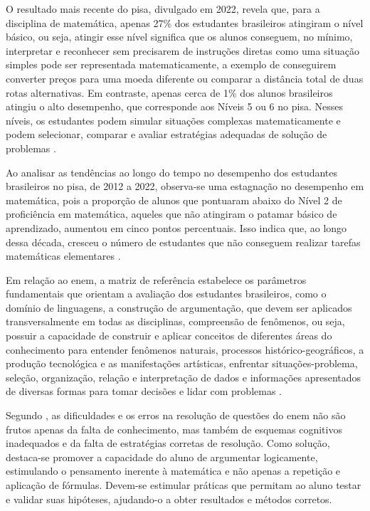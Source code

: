 O resultado mais recente do \gls{pisa}, divulgado em 2022, revela que, para a
disciplina de matemática, apenas 27\% dos estudantes brasileiros atingiram o
nível básico, ou seja, atingir esse nível significa que os alunos conseguem, no
mínimo, interpretar e reconhecer sem precisarem de instruções diretas como uma
situação simples pode ser representada matematicamente, a exemplo de conseguirem
converter preços para uma moeda diferente ou comparar a distância total de duas
rotas alternativas. Em contraste, apenas cerca de 1\% dos alunos brasileiros
atingiu o alto desempenho, que corresponde aos Níveis 5 ou 6 no \gls{pisa}. Nesses
níveis, os estudantes podem simular situações complexas matematicamente e podem
selecionar, comparar e avaliar estratégias adequadas de solução de problemas
\cite{brasil2026pisa}. 

Ao analisar as tendências ao longo do tempo no desempenho dos estudantes
brasileiros no \gls{pisa}, de 2012 a 2022, observa-se uma estagnação no desempenho em
matemática, pois a proporção de alunos que pontuaram abaixo do Nível 2 de
proficiência em matemática, aqueles que não atingiram o patamar básico de
aprendizado, aumentou em cinco pontos percentuais. Isso indica que, ao longo
dessa década, cresceu o número de estudantes que não conseguem realizar tarefas
matemáticas elementares \cite{brasil2026pisa}. 

Em relação ao \gls{enem}, a matriz de referência estabelece os parâmetros fundamentais
que orientam a avaliação dos estudantes brasileiros, como o domínio de
linguagens, a construção de argumentação, que devem ser aplicados
transversalmente em todas as disciplinas, compreensão de fenômenos, ou seja,
possuir a capacidade de construir e aplicar conceitos de diferentes áreas do
conhecimento para entender fenômenos naturais, processos histórico-geográficos,
a produção tecnológica e as manifestações artísticas, enfrentar
situações-problema, seleção, organização, relação e interpretação de dados e
informações apresentados de diversas formas para tomar decisões e lidar com
problemas \cite{matriz_enem}.

Segundo , as dificuldades e os erros na resolução de
questões do \gls{enem} não são frutos apenas da falta de conhecimento, mas também de esquemas
cognitivos inadequados e da falta de estratégias corretas de resolução. Como
solução, destaca-se promover a capacidade do aluno de argumentar logicamente,
estimulando o pensamento inerente à matemática e não apenas a repetição e
aplicação de fórmulas. Devem-se estimular práticas que permitam ao aluno testar
e validar suas hipóteses, ajudando-o a obter resultados e métodos corretos.

